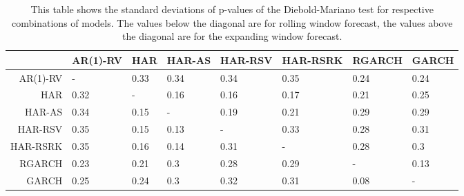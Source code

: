 \begin{table}[ht]
\centering
\begin{tabular}{rlllllll}
  \hline
 & AR(1)-RV & HAR & HAR-AS & HAR-RSV & HAR-RSRK & RGARCH & GARCH \\ 
  \hline
AR(1)-RV & - & 0.33 & 0.34 & 0.34 & 0.35 & 0.24 & 0.24 \\ 
  HAR & 0.32 & - & 0.16 & 0.16 & 0.17 & 0.21 & 0.25 \\ 
  HAR-AS & 0.34 & 0.15 & - & 0.19 & 0.21 & 0.29 & 0.29 \\ 
  HAR-RSV & 0.35 & 0.15 & 0.13 & - & 0.33 & 0.28 & 0.31 \\ 
  HAR-RSRK & 0.35 & 0.16 & 0.14 & 0.31 & - & 0.28 & 0.3 \\ 
  RGARCH & 0.23 & 0.21 & 0.3 & 0.28 & 0.29 & - & 0.13 \\ 
  GARCH & 0.25 & 0.24 & 0.3 & 0.32 & 0.31 & 0.08 & - \\ 
   \hline
\end{tabular}
\caption[DM test standard deviations]{This table shows the standard deviations of p-values of the Diebold-Mariano test for respective combinations of models. 
                The values below the diagonal are for rolling window forecast, the values above the diagonal are for the expanding window forecast.} 
\label{Table:DM_test_SD}
\end{table}
